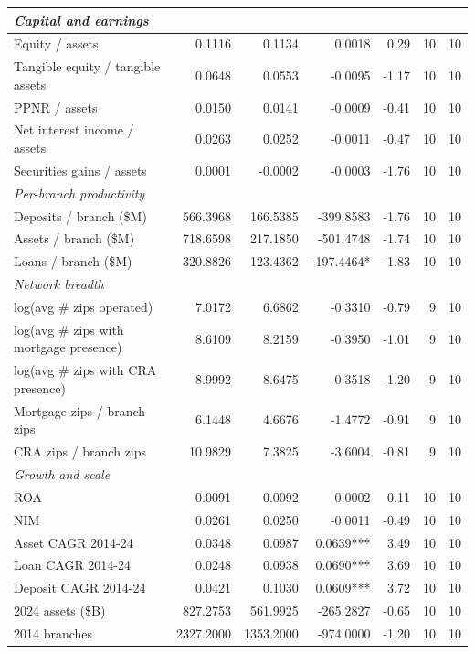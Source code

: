 \begin{tabular}{lrrrrrr}
\midrule
\multicolumn{7}{l}{\emph{Capital and earnings}} \\
\midrule
Equity / assets & 0.1116 & 0.1134 & 0.0018 & 0.29 & 10 & 10 \\
Tangible equity / tangible assets & 0.0648 & 0.0553 & -0.0095 & -1.17 & 10 & 10 \\
PPNR / assets & 0.0150 & 0.0141 & -0.0009 & -0.41 & 10 & 10 \\
Net interest income / assets & 0.0263 & 0.0252 & -0.0011 & -0.47 & 10 & 10 \\
Securities gains / assets & 0.0001 & -0.0002 & -0.0003 & -1.76 & 10 & 10 \\
\midrule
\multicolumn{7}{l}{\emph{Per-branch productivity}} \\
\midrule
Deposits / branch (\$M) & 566.3968 & 166.5385 & -399.8583 & -1.76 & 10 & 10 \\
Assets / branch (\$M) & 718.6598 & 217.1850 & -501.4748 & -1.74 & 10 & 10 \\
Loans / branch (\$M) & 320.8826 & 123.4362 & -197.4464* & -1.83 & 10 & 10 \\
\midrule
\multicolumn{7}{l}{\emph{Network breadth}} \\
\midrule
log(avg \# zips operated) & 7.0172 & 6.6862 & -0.3310 & -0.79 & 9 & 10 \\
log(avg \# zips with mortgage presence) & 8.6109 & 8.2159 & -0.3950 & -1.01 & 9 & 10 \\
log(avg \# zips with CRA presence) & 8.9992 & 8.6475 & -0.3518 & -1.20 & 9 & 10 \\
Mortgage zips / branch zips & 6.1448 & 4.6676 & -1.4772 & -0.91 & 9 & 10 \\
CRA zips / branch zips & 10.9829 & 7.3825 & -3.6004 & -0.81 & 9 & 10 \\
\midrule
\multicolumn{7}{l}{\emph{Growth and scale}} \\
\midrule
ROA & 0.0091 & 0.0092 & 0.0002 & 0.11 & 10 & 10 \\
NIM & 0.0261 & 0.0250 & -0.0011 & -0.49 & 10 & 10 \\
Asset CAGR 2014-24 & 0.0348 & 0.0987 & 0.0639*** & 3.49 & 10 & 10 \\
Loan CAGR 2014-24 & 0.0248 & 0.0938 & 0.0690*** & 3.69 & 10 & 10 \\
Deposit CAGR 2014-24 & 0.0421 & 0.1030 & 0.0609*** & 3.72 & 10 & 10 \\
2024 assets (\$B) & 827.2753 & 561.9925 & -265.2827 & -0.65 & 10 & 10 \\
2014 branches & 2327.2000 & 1353.2000 & -974.0000 & -1.20 & 10 & 10 \\

\end{tabular}

